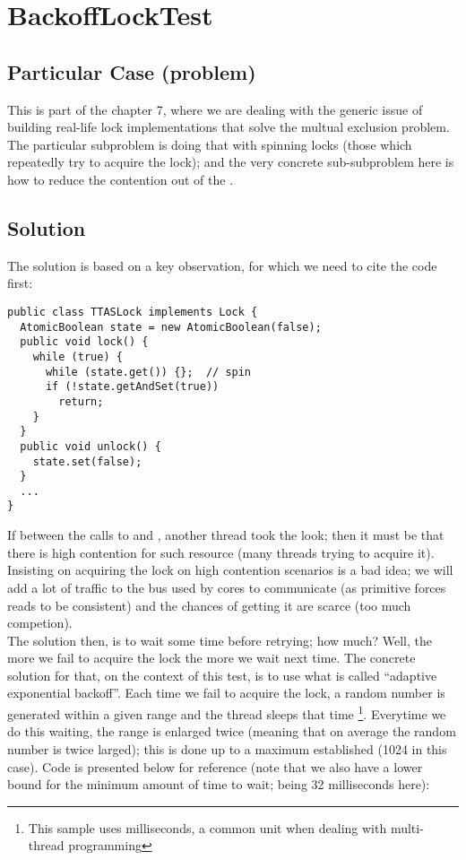 \section{\textbf{BackoffLockTest}}

\subsection{Particular Case (problem)}
This is part of the chapter 7, where we are dealing with the generic
issue of building real-life lock implementations that solve the
multual exclusion problem. The particular subproblem is doing that
with spinning locks (those which repeatedly try to acquire the lock);
and the very concrete sub-subproblem here is how to reduce the
contention out of the .

\subsection{Solution}
The solution is based on a key observation, for which we need to cite
the  code first: \\

\begin{lstlisting}[style=numbers]
public class TTASLock implements Lock {
  AtomicBoolean state = new AtomicBoolean(false);
  public void lock() {
    while (true) {
      while (state.get()) {};  // spin
      if (!state.getAndSet(true))
        return;
    }
  }
  public void unlock() {
    state.set(false);
  }
  ...
}
\end{lstlisting}
\hfill

If between the calls to  and , another thread took
the look; then it must be that there is high contention for such
resource (many threads trying to acquire it). Insisting on acquiring
the lock on high contention scenarios is a bad idea; we will add a lot
of traffic to the bus used by cores to communicate (as primitive
 forces reads to be consistent) and the chances of
getting it are scarce (too much competion). \\

The solution then, is to wait some time before retrying; how much?
Well, the more we fail to acquire the lock the more we wait next time.
The concrete solution for that, on the context of this test, is to use
what is called ``adaptive exponential backoff''. Each time we fail to
acquire the lock, a random number is generated within a given range
and the thread sleeps that time \footnote{This sample uses
  milliseconds, a common unit when dealing with multi-thread
  programming}. Everytime we do this waiting, the range is enlarged
twice (meaning that on average the random number is twice larged);
this is done up to a maximum established (1024 in this case). 
Code is presented below for reference (note that we also have a lower
bound for the minimum amount of time to wait; being 32 milliseconds
here): \\

